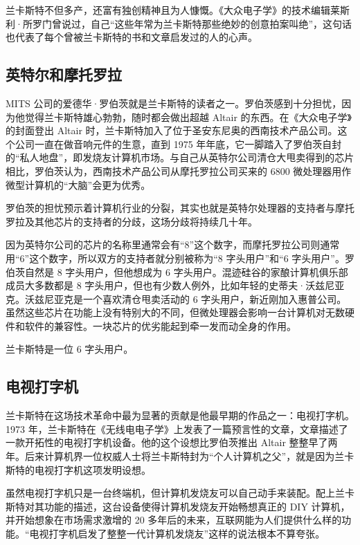 \documentclass[12pt,UTF8]{ctexbook}
\begin{document}
兰卡斯特不但多产，还富有独创精神且为人慷慨。《大众电子学》的技术编辑莱斯利·所罗门曾说过，自己“这些年常为兰卡斯特那些绝妙的创意拍案叫绝”，这句话也代表了每个曾被兰卡斯特的书和文章启发过的人的心声。





\subsection{英特尔和摩托罗拉}


MITS 公司的爱德华·罗伯茨就是兰卡斯特的读者之一。罗伯茨感到十分担忧，因为他觉得兰卡斯特雄心勃勃，随时都会做出超越 Altair 的东西。在《大众电子学》的封面登出 Altair 时，兰卡斯特加入了位于圣安东尼奥的西南技术产品公司。这个公司一直在做音响元件的生意，直到 1975 年年底，它一脚踏入了罗伯茨自封的“私人地盘”，即发烧友计算机市场。与自己从英特尔公司清仓大甩卖得到的芯片相比，罗伯茨认为，西南技术产品公司从摩托罗拉公司买来的 6800 微处理器用作微型计算机的“大脑”会更为优秀。

罗伯茨的担忧预示着计算机行业的分裂，其实也就是英特尔处理器的支持者与摩托罗拉及其他芯片的支持者的分歧，这场分歧将持续几十年。

因为英特尔公司的芯片的名称里通常会有“8”这个数字，而摩托罗拉公司则通常用“6”这个数字，所以双方的支持者就分别被称为“8 字头用户”和“6 字头用户”。罗伯茨自然是 8 字头用户，但他想成为 6 字头用户。混迹硅谷的家酿计算机俱乐部成员大多数都是 8 字头用户，但也有少数人例外，比如年轻的史蒂夫·沃兹尼亚克。沃兹尼亚克是一个喜欢清仓甩卖活动的 6 字头用户，新近刚加入惠普公司。虽然这些芯片在功能上没有特别大的不同，但微处理器会影响一台计算机对无数硬件和软件的兼容性。一块芯片的优劣能起到牵一发而动全身的作用。

兰卡斯特是一位 6 字头用户。





\subsection{电视打字机}


兰卡斯特在这场技术革命中最为显著的贡献是他最早期的作品之一：电视打字机。1973 年，兰卡斯特在《无线电电子学》上发表了一篇预言性的文章，文章描述了一款开拓性的电视打字机设备。他的这个设想比罗伯茨推出 Altair 整整早了两年。后来计算机界一位权威人士将兰卡斯特封为“个人计算机之父”，就是因为兰卡斯特的电视打字机这项发明设想。

虽然电视打字机只是一台终端机，但计算机发烧友可以自己动手来装配。配上兰卡斯特对其功能的描述，这台设备使得计算机发烧友开始畅想真正的 DIY 计算机，并开始想象在市场需求激增的 20 多年后的未来，互联网能为人们提供什么样的功能。“电视打字机启发了整整一代计算机发烧友”这样的说法根本不算夸张。
\end{document}
